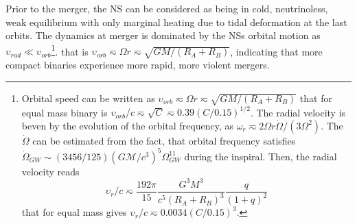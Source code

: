 Prior to the merger, the \ac{NS} can be considered as being in cold, neutrinoless, 
weak equilibrium with only marginal heating due to tidal deformation at the last orbits.
The dynamics at merger is dominated by the \acp{NS} orbital motion
as $\upsilon_{rad}\ll\upsilon_{orb}$\footnote{
    Orbital speed can be written as $\upsilon_{orb}\eqsim\Omega r\eqsim\sqrt{GM/(R_A + R_B)}$
    that for equal mass binary is $\upsilon_{orb}/c\eqsim\sqrt{C}\eqsim0.39(C/0.15)^{1/2}$.
    The radial velocity is beven by the evolution of the orbital frequency, as 
    $\omega_r \eqsim 2\Omega r \dot{\Omega}/(3\Omega^2)$. The $\dot{\Omega}$ can be 
    estimated from the fact, that orbital frequency satisfies 
    $\dot{\Omega}_{GW}\sim(3456/125)(G\mathcal{M}/c^3)^5\Omega_{GW}^{11}$ during the 
    inspiral. Then, the radial velocity reads 
    \begin{equation}
        \upsilon_r/c\eqsim\frac{192\pi}{15}\frac{G^3 M^3}{c^5(R_A + R_B)^3}\frac{q}{(1+q)^2}
    \end{equation}
    that for equal mass gives $\upsilon_r/c \eqsim 0.0034 (C/0.15)^3$.
}.
that is $\upsilon_{orb}\eqsim\Omega r\eqsim\sqrt{GM/(R_A + R_B)}$, indicating that 
more compact binaries experience more rapid, more violent mergers.

